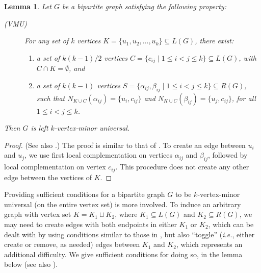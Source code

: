 \documentclass[10pt,a4paper]{article}
\newtheorem{lemma}{Lemma}[section]
\newcommand{\ls}{\leqslant}
\begin{document}
\begin{lemma}\label{lemma:VMUcondition}
    Let $G$ be a bipartite graph satisfying the following property:
%
    \begin{description}
        \item[{\rm\em (VMU)}] For any set of $k$  vertices $K = \{u_1, u_2, \dots, u_k\} \subseteq L(G)$, there exist:
              \begin{enumerate}%
                  \item a set of $k(k-1)/2$  vertices $C = \{c_{ij} \mid 1 \ls i < j \ls k \} \subseteq L(G)$, with  $C\cap K = \emptyset$, and
                  \item a  set of $k(k-1)$  vertices $S = \{\alpha_{ij},\beta_{ij} \mid 1 \ls i < j \ls k \} \subseteq R(G)$, such that 
                   $N_{K \cup C} (\alpha_{ij}) = \{u_i, c_{ij}\}$ and $N_{K \cup C} (\beta_{ij}) = \{u_j, c_{ij}\}$, for all $1\ls i < j \ls k$.
              \end{enumerate}
    \end{description}
    Then $G$ is left $k$-vertex-minor universal.
\end{lemma}
\begin{proof}  
(See also .)
The proof is similar to that of . To create an edge between $u_i$ and $u_j$, we use  first local complementation on vertices $\alpha_{ij}$ and $\beta_{ij}$, followed by local complementation on vertex $c_{ij}$. This procedure does not create any other edge between the vertices of $K$. 
\end{proof}

Providing sufficient conditions for a bipartite graph $G$ to be $k$-vertex-minor universal (on the entire vertex set) is more involved. To induce an arbitrary graph with vertex set $K=K_1 \sqcup K_2$, where $K_1  \subseteq L(G)$ and $K_2\subseteq R(G)$, we may need to create  edges with both endpoints in either $K_1$ or  $K_2$, which can be dealt with by using conditions similar to those in , but also ``toggle'' (\emph{i.e.}, either create or remove, as needed)   edges between $K_1$ and $K_2$, which represents an additional difficulty. We give sufficient conditions for doing so, in the lemma below (see also ). 
\end{document}
